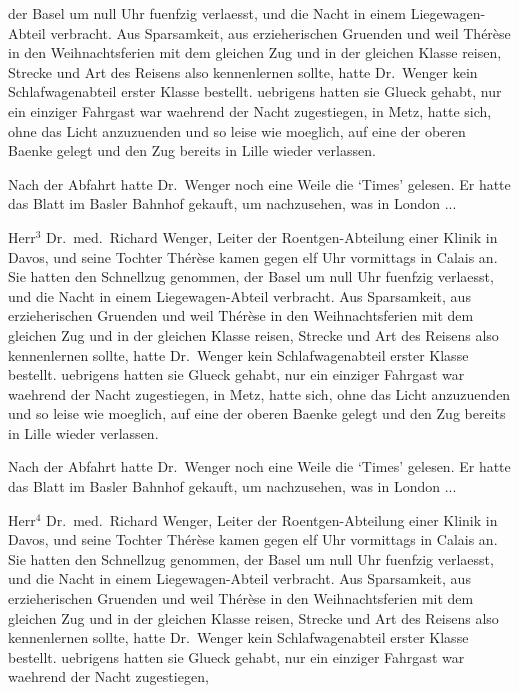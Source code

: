 der Basel um null Uhr fuenfzig verlaesst, und die
Nacht in einem Liege\-wagen-Abteil verbracht.
Aus Sparsamkeit, aus erzieherischen\hfil\break
Gruenden und weil
Th\'e\-r\`ese in den Weihnachtsferien mit dem gleichen
Zug und in der gleichen Klasse reisen, Strecke und
Art des Reisens also kennenlernen sollte, hatte Dr.~Wenger
kein Schlafwagenabteil erster Klasse bestellt.
uebrigens hatten sie Glueck gehabt, nur ein
einziger Fahrgast war waehrend der Nacht zugestiegen,
in Metz, hatte sich, ohne das Licht anzuzuenden
und so leise wie moeglich, auf eine der oberen
Baenke gelegt und den Zug bereits in Lille wieder
verlassen.\par
Nach der Abfahrt hatte Dr.~Wen\-ger noch eine
Weile die `Times' gelesen. Er hatte das Blatt im
Basler Bahnhof gekauft, um nachzusehen, was in London ...\par
Herr$^{3}$ Dr.~med.~Richard Wenger, Leiter der Roent\-gen-Ab\-tei\-lung
einer Klinik in Davos, und seine
Tochter Th\'e\-r\`ese kamen gegen elf Uhr vormittags
in Calais an. Sie hatten den Schnellzug genommen,
der Basel um null Uhr fuenfzig verlaesst, und die
Nacht in einem Liege\-wagen-Abteil verbracht.
Aus Sparsamkeit, aus erzieherischen
Gruenden und weil
Th\'e\-r\`ese in den Weihnachtsferien mit dem gleichen
Zug und in der gleichen Klasse reisen, Strecke und
Art des Reisens also kennenlernen sollte, hatte Dr.~Wenger
kein Schlafwagenabteil erster Klasse bestellt.
uebrigens hatten sie Glueck gehabt, nur ein
einziger Fahrgast war waehrend der Nacht zugestiegen,
in Metz, hatte sich, ohne das Licht anzuzuenden
und so leise wie moeglich, auf eine der oberen
Baenke gelegt und den Zug bereits in Lille wieder
verlassen.\par
Nach der Abfahrt hatte Dr.~Wen\-ger noch eine
Weile die `Times' gelesen. Er hatte das Blatt im
Basler Bahnhof gekauft, um nachzusehen, was in London ...\par
Herr$^{4}$ Dr.~med.~Richard Wenger, Leiter der Roent\-gen-Ab\-tei\-lung
einer Klinik in Davos, und seine
Tochter Th\'e\-r\`ese kamen gegen elf Uhr vormittags
in Calais an. Sie hatten den Schnellzug genommen,
der Basel um null Uhr fuenfzig verlaesst, und die
Nacht in einem Liege\-wagen-Abteil verbracht.
Aus Sparsamkeit, aus erzieherischen
Gruenden und weil
Th\'e\-r\`ese in den Weihnachtsferien mit dem gleichen
Zug und in der gleichen Klasse reisen, Strecke und
Art des Reisens also kennenlernen sollte, hatte Dr.~Wenger
kein Schlafwagenabteil erster Klasse bestellt.
uebrigens hatten sie Glueck gehabt, nur ein
einziger Fahrgast war waehrend der Nacht zugestiegen,
